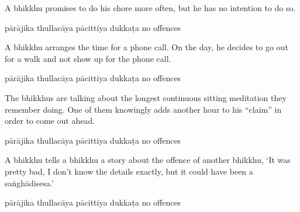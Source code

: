 \begin{exam}{\autoExamName}
\begin{problem*}
\begin{parts}
  \bigskip

\item A bhikkhu promises to do his chore more often, but he has no intention to
  do so.

  \bigskip

  \begin{answers}{5}
    \bChoices
     pārājika\eAns
     thullacāya\eAns
     pācittiya\eAns
     dukkaṭa\eAns
     no offences\eAns
    \eChoices
  \end{answers}

  \bigskip

\item A bhikkhu arranges the time for a phone call. On the day, he decides to go
  out for a walk and not show up for the phone call.

  \bigskip

  \begin{answers}{5}
    \bChoices
     pārājika\eAns
     thullacāya\eAns
     pācittiya\eAns
     dukkaṭa\eAns
     no offences\eAns
    \eChoices
  \end{answers}

  \bigskip

\item The bhikkhus are talking about the longest continuous sitting meditation
  they remember doing. One of them knowingly adds another hour to his ``claim''
  in order to come out ahead.

  \bigskip

  \begin{answers}{5}
    \bChoices
     pārājika\eAns
     thullacāya\eAns
     pācittiya\eAns
     dukkaṭa\eAns
     no offences\eAns
    \eChoices
  \end{answers}

  \bigskip

\item A bhikkhu tells a bhikkhu a story about the offence of another bhikkhu,
  `It was pretty bad, I don't know the details exactly, but it could have been a
  saṅghādisesa.'

  \bigskip

  \begin{answers}{5}
    \bChoices
     pārājika\eAns
     thullacāya\eAns
     pācittiya\eAns
     dukkaṭa\eAns
     no offences\eAns
    \eChoices
  \end{answers}

  \bigskip


\end{parts}
\end{problem*}
\end{exam}
